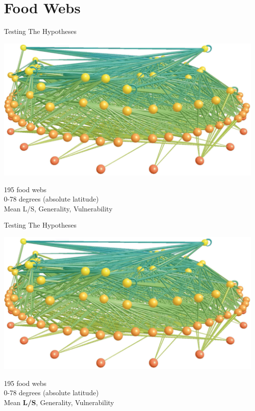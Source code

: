 \documentclass{beamer}
\begin{document}
\section*{Food Webs}
  \begin{frame}{Testing The Hypotheses}

    \begin{center}
      \includegraphics*[width=.8\textwidth]{Figures/LittleRockLake.eps}


    195 food webs \\
    0-78 degrees (absolute latitude) \\
    Mean L/S, Generality, Vulnerability

    \end{center}

  \end{frame}


  \begin{frame}{Testing The Hypotheses}

    \begin{center}
      \includegraphics*[width=.8\textwidth]{Figures/LittleRockLake.eps}


    195 food webs \\
    0-78 degrees (absolute latitude) \\
    Mean \textbf{L/S}, Generality, Vulnerability

    \end{center}

  \end{frame}
\end{document}
